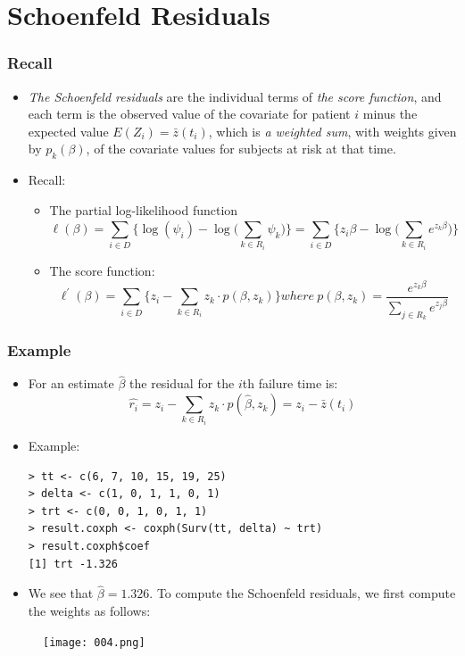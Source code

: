\documentclass{beamer}
\newcommand{\empr}[1]{{\emph{\color{red}#1}}}
\begin{document}
\section{Schoenfeld Residuals}
\begin{frame}
\frametitle{Recall}
\begin{itemize}
\item \empr{The Schoenfeld residuals} are the individual terms of \empr{the score function}, and each term is the observed value of the covariate for patient $i$ minus the expected value $E(Z_i) = \bar{z}(t_i)$, which is \empr{a weighted sum}, with weights given by $p_k(\beta)$, of the covariate values for subjects at risk at that time.
\item Recall:
\begin{itemize}
	\item The partial log-likelihood function
	\begin{equation}
	\ell(\beta) = \sum\limits_{i\in D }^{}\bigg\lbrace \log(\psi_i) - \log \bigg( \sum\limits_{k\in R_i }^{} \psi_k \bigg) \bigg\rbrace = \sum\limits_{i\in D }^{}\bigg\lbrace z_i\beta - \log \bigg( \sum\limits_{k\in R_i }^{} e^{z_k\beta} \bigg) \bigg\rbrace
	\end{equation}
	\item The score function:
		\begin{equation}
	\ell^{'}(\beta) = \sum\limits_{i\in D }^{}\bigg\lbrace z_i - \sum\limits_{k\in R_i }^{}z_k\cdot p(\beta,z_k) \bigg\rbrace  where \ p(\beta, z_k) = \frac{e^{z_k\beta	}}{\sum\limits_{j\in R_k}{}e^{z_j\beta}}  
	\end{equation}
\end{itemize}
\end{itemize}
\end{frame}


\pagebreak
\begin{frame}[fragile]
\frametitle{Example}
\begin{itemize}
\item For an estimate $\hat{\beta}$ the residual for the $i$th failure time is:
\begin{equation}
\hat{r_i} = z_i - \sum\limits_{k\in R_i}^{}z_k\cdot p(\hat{\beta},z_k) = z_i-\bar{z}(t_i)
\end{equation}
\item Example:
\begin{Verbatim}
> tt <- c(6, 7, 10, 15, 19, 25)
> delta <- c(1, 0, 1, 1, 0, 1)
> trt <- c(0, 0, 1, 0, 1, 1)
> result.coxph <- coxph(Surv(tt, delta) ~ trt) 
> result.coxph$coef
[1] trt -1.326
\end{Verbatim}
\item We see that $\hat{\beta}=1.326$. To compute the Schoenfeld residuals, we first compute the weights as follows:
\end{itemize}
\begin{figure}
	\texttt{[image: 004.png]}
\end{figure}
\end{frame}
\end{document}
